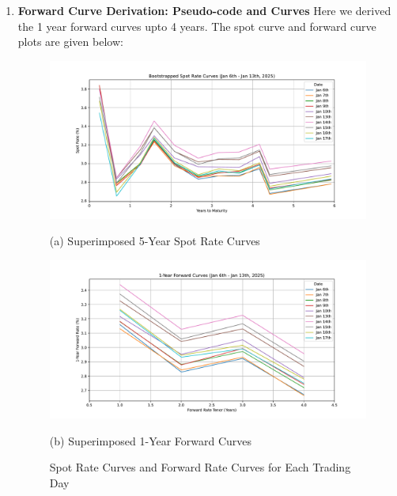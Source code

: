 \documentclass{article}
\begin{document}
\begin{enumerate}
\begin{enumerate}
            \item \textbf{Forward Curve Derivation: Pseudo-code and Curves}
            Here we derived the 1 year forward curves upto 4 years. The spot curve and forward curve plots are given below:
        \begin{enumerate}
            \begin{figure}[h!]
                \centering
                \begin{minipage}{0.48\textwidth} %
                    \centering
                    \includegraphics[width=\linewidth]{spot_curves.pdf} %
                    \caption*{(a) Superimposed 5-Year Spot Rate Curves} %
                    \label{fig:spot_curves}
                \end{minipage}
                \hfill %
                \begin{minipage}{0.48\textwidth} %
                    \centering
                    \includegraphics[width=\linewidth]{forward_curves.pdf} %
                    \caption*{(b) Superimposed 1-Year Forward Curves} %
                    \label{fig:forward_curves}
                \end{minipage}
                \caption{Spot Rate Curves and Forward Rate Curves for Each Trading Day} %
                \label{fig:spot_and_forward_curves} 
            \end{figure}
            

\end{enumerate}
\end{enumerate}
\end{enumerate}
\end{document}
